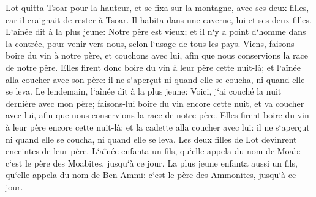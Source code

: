\verse Lot quitta Tsoar pour la hauteur, et se fixa sur la montagne, avec ses deux filles, car il craignait de rester à Tsoar. Il habita dans une caverne, lui et ses deux filles. 
\verse L`aînée dit à la plus jeune: Notre père est vieux; et il n`y a point d`homme dans la contrée, pour venir vers nous, selon l`usage de tous les pays. 
\verse Viens, faisons boire du vin à notre père, et couchons avec lui, afin que nous conservions la race de notre père. 
\verse Elles firent donc boire du vin à leur père cette nuit-là; et l`aînée alla coucher avec son père: il ne s`aperçut ni quand elle se coucha, ni quand elle se leva. 
\verse Le lendemain, l`aînée dit à la plus jeune: Voici, j`ai couché la nuit dernière avec mon père; faisons-lui boire du vin encore cette nuit, et va coucher avec lui, afin que nous conservions la race de notre père. 
\verse Elles firent boire du vin à leur père encore cette nuit-là; et la cadette alla coucher avec lui: il ne s`aperçut ni quand elle se coucha, ni quand elle se leva. 
\verse Les deux filles de Lot devinrent enceintes de leur père. 
\verse L`aînée enfanta un fils, qu`elle appela du nom de Moab: c`est le père des Moabites, jusqu`à ce jour. 
\verse La plus jeune enfanta aussi un fils, qu`elle appela du nom de Ben Ammi: c`est le père des Ammonites, jusqu`à ce jour. 

